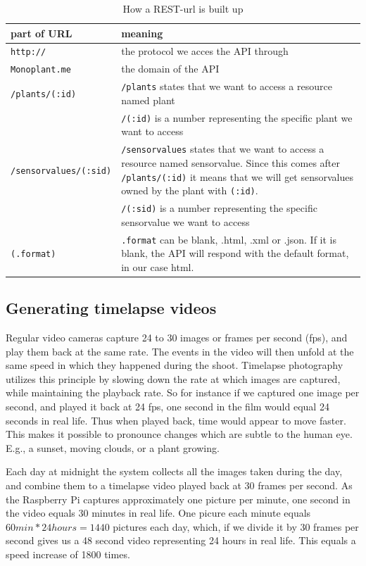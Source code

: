 \bgroup
\def\arraystretch{1.8}	%
\begin{table}
	\centering
	\begin{tabular}{@{}lp{250pt}@{}} \toprule
		\textbf{part of URL}&	\textbf{meaning}\\ \midrule
		\texttt{http://}&	the protocol we acces the API through\\ 
		\texttt{Monoplant.me}&	the domain of the API\\ 
		\texttt{/plants/(:id)}&	\texttt{/plants} states that we want to access a resource named plant \\ &
		\texttt{/(:id)} is a number representing the specific plant we want to access\\ 
		\texttt{/sensorvalues/(:sid)}&	\texttt{/sensorvalues} states that we want to access a resource named sensorvalue. Since this comes after \texttt{/plants/(:id)} it means that we will get sensorvalues owned by the plant with \texttt{(:id)}. \\ &
		\texttt{/(:sid)} is a number representing the specific sensorvalue we want to access\\ 
		\texttt{(.format)}&	 \texttt{.format} can be blank, .html, .xml or .json. If it is blank, the API will respond with the default format, in our case html. \\ \bottomrule
	\end{tabular}
	\caption{How a REST-url is built up}
	\label{fig:RESTurl}
\end{table}
\egroup

\subsection{Generating timelapse videos}
Regular video cameras capture 24 to 30 images or frames per second (fps), and play them back at the same rate. The events in the video will then unfold at the same speed in which they happened during the shoot. Timelapse photography utilizes this principle by slowing down the rate at which images are captured, while maintaining the playback rate. So for instance if we captured one image per second, and played it back at 24 fps, one second in the film would equal 24 seconds in real life. Thus when played back, time would appear to move faster. This makes it possible to pronounce changes which are subtle to the human eye. E.g., a sunset, moving clouds, or a plant growing.  

Each day at midnight the system collects all the images taken during the day, and combine them to a timelapse video played back at 30 frames per second. As the Raspberry Pi captures approximately one picture per minute, one second in the video equals 30 minutes in real life. One picure each minute equals \begin{math} 60min*24hours=1440 \end{math}
pictures each day, which, if we divide it by 30 frames per second gives us a 48 second video representing 24 hours in real life. This equals a speed increase of 1800 times. 

